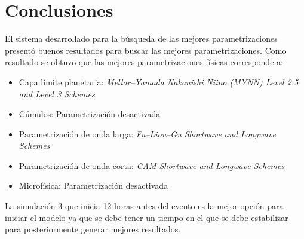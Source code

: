 \section{Conclusiones}

El sistema desarrollado para la búsqueda de las mejores parametrizaciones presentó buenos resultados para buscar las mejores parametrizaciones. Como resultado se obtuvo que las mejores parametrizaciones físicas corresponde a:

\begin{itemize}
    \item Capa límite planetaria: \textit{Mellor–Yamada Nakanishi Niino (MYNN) Level 2.5 and Level 3 Schemes}
    \item Cúmulos: Parametrización desactivada
    \item Parametrización de onda larga: \textit{Fu–Liou–Gu Shortwave and Longwave Schemes}
    \item Parametrización de onda corta: \textit{CAM Shortwave and Longwave Schemes}
    \item Microfísica: Parametrización desactivada
\end{itemize}

La simulación 3 que inicia 12 horas antes del evento es la mejor opción para iniciar el modelo ya que se debe tener un tiempo en el que se debe estabilizar para posteriormente generar mejores resultados.


